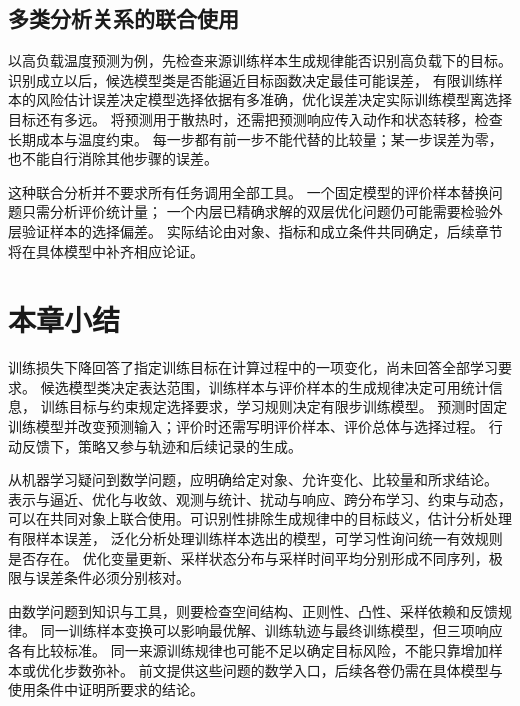 \FloatBarrier
\subsection{多类分析关系的联合使用}
\label{sec:future-combined-analysis-relations}

以高负载温度预测为例，先检查来源训练样本生成规律能否识别高负载下的目标。
识别成立以后，候选模型类是否能逼近目标函数决定最佳可能误差，
有限训练样本的风险估计误差决定模型选择依据有多准确，优化误差决定实际训练模型离选择目标还有多远。
将预测用于散热时，还需把预测响应传入动作和状态转移，检查长期成本与温度约束。
每一步都有前一步不能代替的比较量；某一步误差为零，也不能自行消除其他步骤的误差。

这种联合分析并不要求所有任务调用全部工具。
一个固定模型的评价样本替换问题只需分析评价统计量；
一个内层已精确求解的双层优化问题仍可能需要检验外层验证样本的选择偏差。
实际结论由对象、指标和成立条件共同确定，后续章节将在具体模型中补齐相应论证。

\FloatBarrier
\section{本章小结}
\label{sec:future-summary}

训练损失下降回答了指定训练目标在计算过程中的一项变化，尚未回答全部学习要求。
候选模型类决定表达范围，训练样本与评价样本的生成规律决定可用统计信息，
训练目标与约束规定选择要求，学习规则决定有限步训练模型。
预测时固定训练模型并改变预测输入；评价时还需写明评价样本、评价总体与选择过程。
行动反馈下，策略又参与轨迹和后续记录的生成。

从机器学习疑问到数学问题，应明确给定对象、允许变化、比较量和所求结论。
表示与逼近、优化与收敛、观测与统计、扰动与响应、跨分布学习、约束与动态，
可以在共同对象上联合使用。可识别性排除生成规律中的目标歧义，估计分析处理有限样本误差，
泛化分析处理训练样本选出的模型，可学习性询问统一有效规则是否存在。
优化变量更新、采样状态分布与采样时间平均分别形成不同序列，极限与误差条件必须分别核对。

由数学问题到知识与工具，则要检查空间结构、正则性、凸性、采样依赖和反馈规律。
同一训练样本变换可以影响最优解、训练轨迹与最终训练模型，但三项响应各有比较标准。
同一来源训练规律也可能不足以确定目标风险，不能只靠增加样本或优化步数弥补。
前文提供这些问题的数学入口，后续各卷仍需在具体模型与使用条件中证明所要求的结论。
